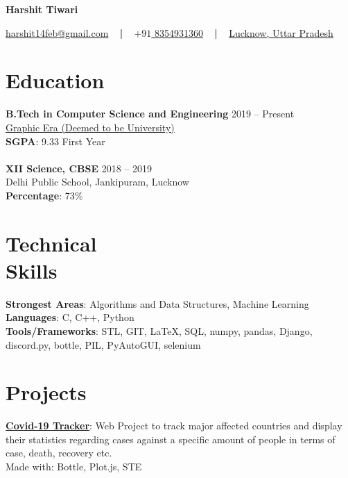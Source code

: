 \documentclass[margin, centered]{res}
\begin{document}
	\begin{center}
		\hspace{-\hoffset}
		\huge\bf{Harshit Tiwari}
	\end{center}
	\begin{center}
		\hspace{-\hoffset}
		\href{mailto:harshit14feb@gmail.com}{harshit14feb@gmail.com}
		~ \textbf{|} ~
		\href{tel:+919532655323}{\(+91\) 8354931360}
		~ \textbf{|} ~
		\href{https://goo.gl/maps/Sh5vC8Vo78Y3cWfr9}{Lucknow, Uttar Pradesh}
	\end{center}

	\begin{resume}
		\section{Education}
			\textbf{B.Tech in Computer Science and Engineering} \hfill 2019 – Present \\
			\href{https://www.geu.ac.in/}{Graphic Era (Deemed to be University)}\\
			\textbf{SGPA}: 9.33 First Year \\ 
			\\
			\textbf{XII Science, CBSE} \hfill 2018 – 2019 \\
			Delhi Public School, Jankipuram, Lucknow \\
			\textbf{Percentage}: 73\%
		
		\section{Technical \\ Skills}
			\textbf{Strongest Areas}: Algorithms and Data Structures, Machine Learning\\
			\textbf{Languages}: C, C++, Python\\
			\textbf{Tools/Frameworks}: STL, GIT, \LaTeX, SQL, numpy, pandas, Django, discord.py, bottle, PIL, PyAutoGUI, selenium

		
		\section{Projects}
			\textbf{\href{https://github.com/FireFeathers06/covid-19}{Covid-19 Tracker}}:
			Web Project to track major affected countries and display their statistics regarding 
			cases against a specific amount of people in terms of case, death, recovery etc.\\
			Made with: Bottle, Plot.js, STE
			\\ \\
			

\end{resume}
\end{document}
